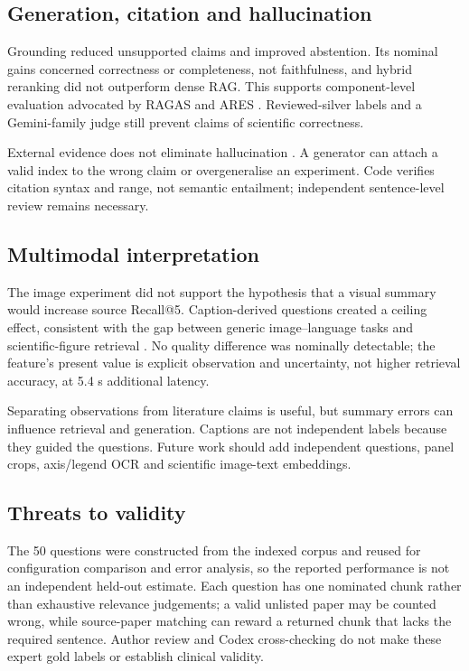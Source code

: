 \documentclass[11pt,a4paper]{article}
\begin{document}
\subsection{Generation, citation and hallucination}
\label{sec:generation-citation-and-hallucination}

Grounding reduced unsupported claims and improved abstention. Its nominal gains concerned correctness or completeness, not faithfulness, and hybrid reranking did not outperform dense RAG. This supports component-level evaluation advocated by RAGAS and ARES \cite{es2024ragas,saadfalcon2024ares}. Reviewed-silver labels and a Gemini-family judge still prevent claims of scientific correctness.

External evidence does not eliminate hallucination \cite{li2023halueval,bouyamourn2023hallucinate,amugongo2025healthcare}. A generator can attach a valid index to the wrong claim or overgeneralise an experiment. Code verifies citation syntax and range, not semantic entailment; independent sentence-level review remains necessary.

\subsection{Multimodal interpretation}
\label{sec:multimodal-interpretation}

The image experiment did not support the hypothesis that a visual summary would increase source Recall@5. Caption-derived questions created a ceiling effect, consistent with the gap between generic image--language tasks \cite{radford2021clip,li2022blip} and scientific-figure retrieval \cite{wu2024scimmir}. No quality difference was nominally detectable; the feature's present value is explicit observation and uncertainty, not higher retrieval accuracy, at 5.4 s additional latency.

Separating observations from literature claims is useful, but summary errors can influence retrieval and generation. Captions are not independent labels because they guided the questions. Future work should add independent questions, panel crops, axis/legend OCR and scientific image-text embeddings.

\subsection{Threats to validity}
\label{sec:threats-to-validity}

The 50 questions were constructed from the indexed corpus and reused for configuration comparison and error analysis, so the reported performance is not an independent held-out estimate. Each question has one nominated chunk rather than exhaustive relevance judgements; a valid unlisted paper may be counted wrong, while source-paper matching can reward a returned chunk that lacks the required sentence. Author review and Codex cross-checking do not make these expert gold labels or establish clinical validity.
\end{document}
